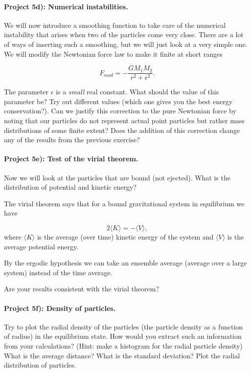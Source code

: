 \documentclass[%
oneside,                 %
final,                   %
10pt]{article}
\begin{document}
\paragraph{Project 5d): Numerical instabilities.}
We will now introduce a smoothing function to take care of
  the numerical instability that arises when two of the particles come
  very close. There are a lot of ways of inserting such a smoothing, but
  we will just look at a very simple one. We will modify the Newtonian
  force law to make it finite at short ranges

\begin{equation*} 
F_{mod} = -\frac{GM_1M_2}{r^2 + \epsilon^2}.
\end{equation*}

The parameter $\epsilon$ is a \emph{small} real constant. What should the value of this parameter be? Try out different values (which one gives you the best energy conservation?). Can we justify this correction to the pure Newtonian force by noting that our particles do not represent actual point particles
but rather mass distributions of some finite extent? Does the addition
of this correction change any of the results from the previous exercise?


\paragraph{Project 5e): Test of the virial theorem.}
Now we will look at the particles that are bound (not ejected). 
What is the distribution of potential and kinetic energy?

The virial theorem says that for a bound gravitational system in
equilibrium we have

\begin{equation*}
2\langle K\rangle = -\langle V \rangle,
\end{equation*}
where $\langle K\rangle$
is the average (over time) kinetic energy of the system and $ \langle V
\rangle$ is the average potential energy. 

By the ergodic hypothesis we can take an ensemble 
average (average over a large system) instead of the time average. 

Are your results consistent with the virial theorem? 


\paragraph{Project 5f): Density of particles.}
Try to plot the radial density of the particles (the particle density as a function of radius) in the
  equilibrium state. How would you extract such an information from your calculations? (Hint: make a histogram for the radial
particle density) What is the average distance? What is the
  standard deviation? Plot the radial distribution of particles.
\end{document}

